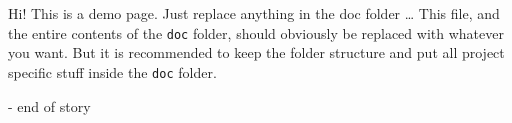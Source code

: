 \documentclass[12pt,a4paper]{report}
\begin{document}
\begin{center}
    \huge{Hi! This is a demo page. Just replace anything in the doc folder \ldots}
    \break{}
    \normalsize
    This file, and the entire contents of the \texttt{doc} folder, should obviously be replaced with whatever you want. But it is recommended to keep the folder structure and put all project specific stuff inside the \texttt{doc} folder.
    \vspace{50mm}
    \break{}
    
    \vspace{50mm}
    \break{}
    \huge{- end of story}
\end{center}
\end{document}

